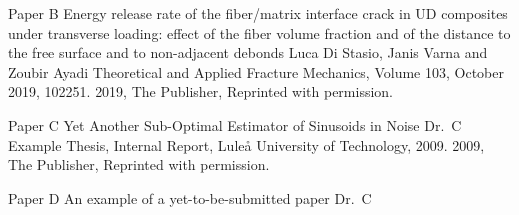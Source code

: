 \documentclass[12pt,a4paper,openright,final,twoside]{msethesis}
\begin{document}



\def\paperheader{Paper B}
\def\papertitle{Energy release rate of the fiber/matrix interface crack in UD composites under transverse loading: effect of the fiber volume fraction and of the distance to the free surface and to non-adjacent debonds}
\def\paperauthorstring{Luca Di Stasio, Janis Varna and Zoubir Ayadi}
\def\referencestring{Theoretical and Applied Fracture Mechanics, Volume 103, October 2019, 102251.}
\def\copyrightstring{2019, The Publisher, Reprinted with permission.}


\newrefsection
\makepaper
  {\paperheader}
  {\papertitle}
  {\paperauthorstring}
  {\referencestring}
  {\copyrightstring}



\def\paperheader{Paper C}
\def\papertitle{Yet Another Sub-Optimal Estimator of Sinusoids in Noise}
\def\paperauthorstring{Dr.\ C}
\def\referencestring{Example Thesis, Internal Report, Lule{\aa} University of Technology, 2009.}
\def\copyrightstring{2009, The Publisher, Reprinted with permission.}


\makepapersubmitted
  {\paperheader}
  {\papertitle}
  {\paperauthorstring}
  {\referencestring}
  {\copyrightstring}

%

\def\paperheader{Paper D}
\def\papertitle{An example of a yet-to-be-submitted paper}
\def\paperauthorstring{Dr.\ C}


\makepapertobesubmitted
  {\paperheader}
  {\papertitle}
  {\paperauthorstring}

%
\end{document}
